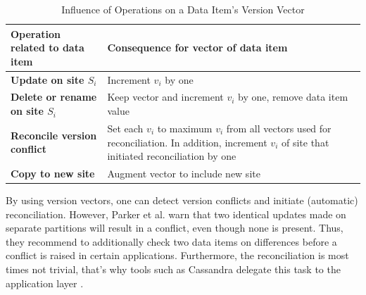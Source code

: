 \begin{table}[ht]
    \centering
    \begin{tabularx}{\linewidth}{@{}>{\bfseries}l@{\hspace{.5em}}X@{}}
        \toprule
        \textbf{Operation related to data item} & \textbf{Consequence for vector of data item}\\ \midrule
        Update on site $S_i$ & Increment $v_i$ by one\\
        Delete or rename on site $S_i$ & Keep vector and increment $v_i$ by one, remove data item value\\
        Reconcile version conflict & Set each $v_i$ to maximum $v_i$ from all vectors used for reconciliation. In addition, increment $v_i$ of site that initiated reconciliation by one\\
        Copy to new site & Augment vector to include new site\\
        \bottomrule
    \end{tabularx}
    \caption{Influence of Operations on a Data Item's Version Vector}
    \label{tab:vectorOperations}
\end{table}

By using version vectors, one can detect version conflicts and initiate (automatic) reconciliation.
However, Parker et al. warn that two identical updates made on separate partitions will result in a conflict, even though none is present.
Thus, they recommend to additionally check two data items on differences before a conflict is raised in certain applications.
Furthermore, the reconciliation is most times not trivial, that's why tools such as Cassandra delegate this task to the application layer \cite{cassandra2010}.
